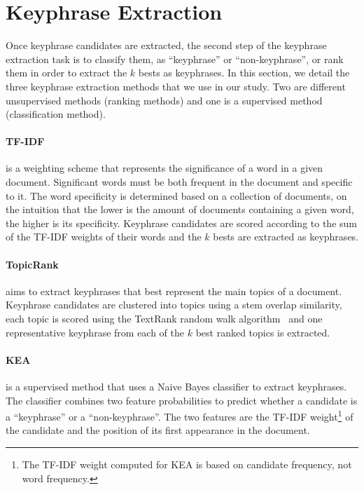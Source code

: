 \section{Keyphrase Extraction}
\label{sec:keyphrase_extraction}
  Once keyphrase candidates are extracted, the second step of the keyphrase
  extraction task is to classify them, as ``keyphrase'' or ``non-keyphrase'', or
  rank them in order to extract the $k$ bests as keyphrases. In this section,
  we detail the three keyphrase extraction methods that we use in our study.
  Two are different unsupervised methods (ranking methods) and one is a
  supervised method (classification method).

  \paragraph{TF-IDF~\textnormal{\cite{jones1972tfidf}}} is a weighting scheme
  that represents the significance of a word in a given document. Significant
  words must be both frequent in the document and specific to it. The word
  specificity is determined based on a collection of documents, on the intuition
  that the lower is the amount of documents containing a given word, the higher
  is its specificity. Keyphrase candidates are scored according to the sum of
  the TF-IDF weights of their words and the $k$ bests are extracted as
  keyphrases.

  \paragraph{TopicRank~\textnormal{\cite{bougouin2013topicrank}}} aims to
  extract keyphrases that best represent the main topics of a document.
  Keyphrase candidates are clustered into topics using a stem overlap
  similarity, each topic is scored using the TextRank random walk
  algorithm~\cite{mihalcea2004textrank} and one representative keyphrase from
  each of the $k$ best ranked topics is extracted.

  \paragraph{KEA~\textnormal{\cite{witten1999kea}}} is a supervised method that
  uses a Naive Bayes classifier to extract keyphrases. The classifier combines
  two feature probabilities to predict whether a candidate is a ``keyphrase'' or
  a ``non-keyphrase''. The two features are the TF-IDF weight\footnote{The
    TF-IDF weight computed for KEA is based on candidate frequency, not word
  frequency.} of the candidate and the position of its first appearance in the
  document.

